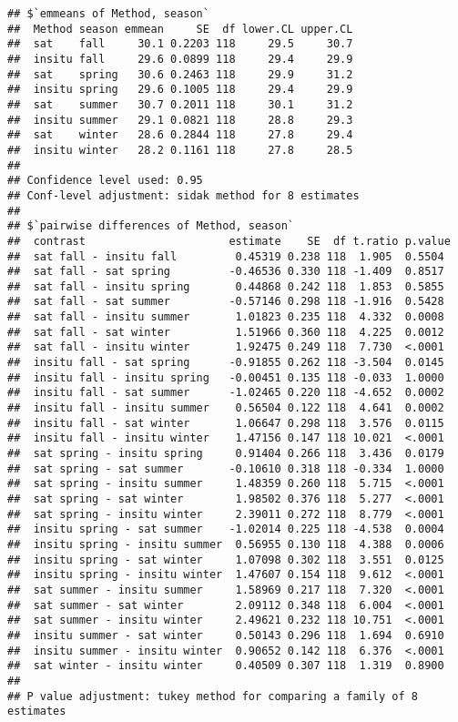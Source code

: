 \documentclass[
]{article}
\begin{document}
\begin{verbatim}
## $`emmeans of Method, season`
##  Method season emmean     SE  df lower.CL upper.CL
##  sat    fall     30.1 0.2203 118     29.5     30.7
##  insitu fall     29.6 0.0899 118     29.4     29.9
##  sat    spring   30.6 0.2463 118     29.9     31.2
##  insitu spring   29.6 0.1005 118     29.4     29.9
##  sat    summer   30.7 0.2011 118     30.1     31.2
##  insitu summer   29.1 0.0821 118     28.8     29.3
##  sat    winter   28.6 0.2844 118     27.8     29.4
##  insitu winter   28.2 0.1161 118     27.8     28.5
## 
## Confidence level used: 0.95 
## Conf-level adjustment: sidak method for 8 estimates 
## 
## $`pairwise differences of Method, season`
##  contrast                      estimate    SE  df t.ratio p.value
##  sat fall - insitu fall         0.45319 0.238 118  1.905  0.5504 
##  sat fall - sat spring         -0.46536 0.330 118 -1.409  0.8517 
##  sat fall - insitu spring       0.44868 0.242 118  1.853  0.5855 
##  sat fall - sat summer         -0.57146 0.298 118 -1.916  0.5428 
##  sat fall - insitu summer       1.01823 0.235 118  4.332  0.0008 
##  sat fall - sat winter          1.51966 0.360 118  4.225  0.0012 
##  sat fall - insitu winter       1.92475 0.249 118  7.730  <.0001 
##  insitu fall - sat spring      -0.91855 0.262 118 -3.504  0.0145 
##  insitu fall - insitu spring   -0.00451 0.135 118 -0.033  1.0000 
##  insitu fall - sat summer      -1.02465 0.220 118 -4.652  0.0002 
##  insitu fall - insitu summer    0.56504 0.122 118  4.641  0.0002 
##  insitu fall - sat winter       1.06647 0.298 118  3.576  0.0115 
##  insitu fall - insitu winter    1.47156 0.147 118 10.021  <.0001 
##  sat spring - insitu spring     0.91404 0.266 118  3.436  0.0179 
##  sat spring - sat summer       -0.10610 0.318 118 -0.334  1.0000 
##  sat spring - insitu summer     1.48359 0.260 118  5.715  <.0001 
##  sat spring - sat winter        1.98502 0.376 118  5.277  <.0001 
##  sat spring - insitu winter     2.39011 0.272 118  8.779  <.0001 
##  insitu spring - sat summer    -1.02014 0.225 118 -4.538  0.0004 
##  insitu spring - insitu summer  0.56955 0.130 118  4.388  0.0006 
##  insitu spring - sat winter     1.07098 0.302 118  3.551  0.0125 
##  insitu spring - insitu winter  1.47607 0.154 118  9.612  <.0001 
##  sat summer - insitu summer     1.58969 0.217 118  7.320  <.0001 
##  sat summer - sat winter        2.09112 0.348 118  6.004  <.0001 
##  sat summer - insitu winter     2.49621 0.232 118 10.751  <.0001 
##  insitu summer - sat winter     0.50143 0.296 118  1.694  0.6910 
##  insitu summer - insitu winter  0.90652 0.142 118  6.376  <.0001 
##  sat winter - insitu winter     0.40509 0.307 118  1.319  0.8900 
## 
## P value adjustment: tukey method for comparing a family of 8 estimates
\end{verbatim}
\end{document}
